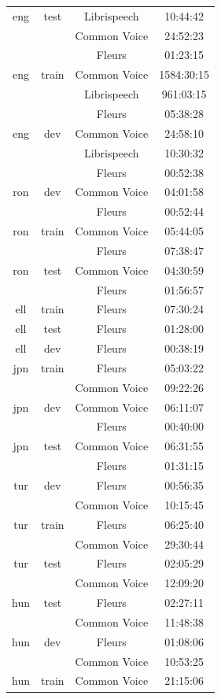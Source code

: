 \begin{longtable}{cccc}
eng & test & Librispeech & 10:44:42 \\ 
 & & Common Voice & 24:52:23 \\ 
 & & Fleurs & 01:23:15 \\ 
eng & train & Common Voice & 1584:30:15 \\ 
 & & Librispeech & 961:03:15 \\ 
 & & Fleurs & 05:38:28 \\ 
eng & dev & Common Voice & 24:58:10 \\ 
 & & Librispeech & 10:30:32 \\ 
 & & Fleurs & 00:52:38 \\ \midrule
ron & dev & Common Voice & 04:01:58 \\ 
 & & Fleurs & 00:52:44 \\ 
ron & train & Common Voice & 05:44:05 \\ 
 & & Fleurs & 07:38:47 \\ 
ron & test & Common Voice & 04:30:59 \\ 
 & & Fleurs & 01:56:57 \\ \midrule
ell & train & Fleurs & 07:30:24 \\ 
ell & test & Fleurs & 01:28:00 \\ 
ell & dev & Fleurs & 00:38:19 \\ \midrule
jpn & train & Fleurs & 05:03:22 \\ 
 & & Common Voice & 09:22:26 \\ 
jpn & dev & Common Voice & 06:11:07 \\ 
 & & Fleurs & 00:40:00 \\ 
jpn & test & Common Voice & 06:31:55 \\ 
 & & Fleurs & 01:31:15 \\ \midrule
tur & dev & Fleurs & 00:56:35 \\ 
 & & Common Voice & 10:15:45 \\ 
tur & train & Fleurs & 06:25:40 \\ 
 & & Common Voice & 29:30:44 \\ 
tur & test & Fleurs & 02:05:29 \\ 
 & & Common Voice & 12:09:20 \\ \midrule
hun & test & Fleurs & 02:27:11 \\ 
 & & Common Voice & 11:48:38 \\ 
hun & dev & Fleurs & 01:08:06 \\ 
 & & Common Voice & 10:53:25 \\ 
hun & train & Common Voice & 21:15:06 \\ 

\end{longtable}
